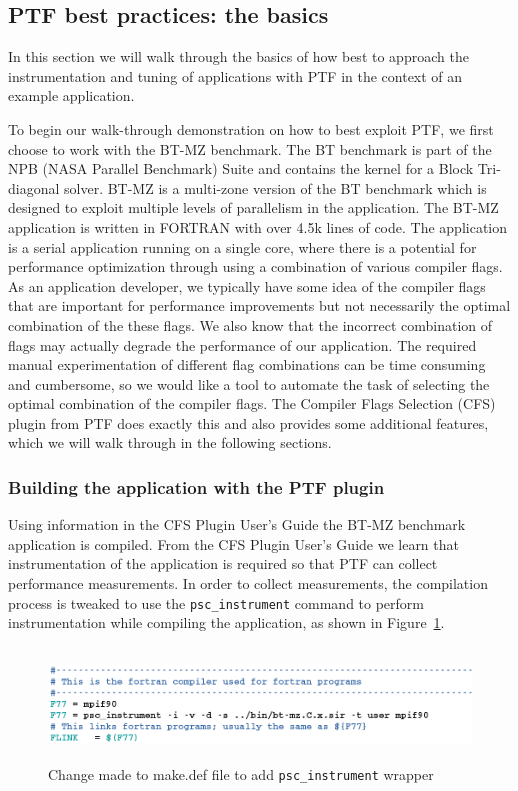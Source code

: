 \subsection{PTF best practices: the basics }
In this section we will walk through the basics of how best to approach the instrumentation and tuning of applications with PTF in the context of an example application.

To begin our walk-through demonstration on how to best exploit PTF, we first choose to work with the BT-MZ benchmark. The BT benchmark is part of the NPB (NASA Parallel Benchmark) Suite \cite{NPB} and contains the kernel for a Block Tri-diagonal solver. BT-MZ is a multi-zone version of the BT benchmark which is designed to exploit multiple levels of parallelism in the application. The BT-MZ application is written in FORTRAN with over 4.5k lines of code. The application is a serial application running on a single core, where there is a potential for performance optimization through using a combination of various compiler flags. As an application developer, we typically have some idea of the compiler flags that are important for performance improvements but not necessarily the optimal combination of the these flags. We also know that the incorrect combination of flags may actually degrade the performance of our application. The required manual experimentation of different flag combinations can be time consuming and cumbersome, so we would like a tool to automate the task of selecting the optimal combination of the compiler flags. The Compiler Flags Selection (CFS) plugin from PTF does exactly this and also provides some additional features, which we will walk through in the following sections.

\subsubsection{Building the application with the PTF plugin}

Using information in the CFS Plugin User's Guide \cite{CFSguide} the BT-MZ benchmark application is compiled.
From the CFS Plugin User's Guide we learn that instrumentation of the application is required so that PTF can collect performance measurements. In order to collect measurements, the compilation process is tweaked to use the \texttt{psc\_instrument} command to perform instrumentation while compiling the application, as shown in Figure~\ref{fig:uc1_CFS_make_file}.

\begin{figure}[H]
	\centering
	\includegraphics[height=3cm, width=\textwidth]{../BPG/images/uc1_CFS_make_file.png}
	\caption{Change made to make.def file to add {\tt psc\_instrument} wrapper }
	\label{fig:uc1_CFS_make_file}
\end{figure}

